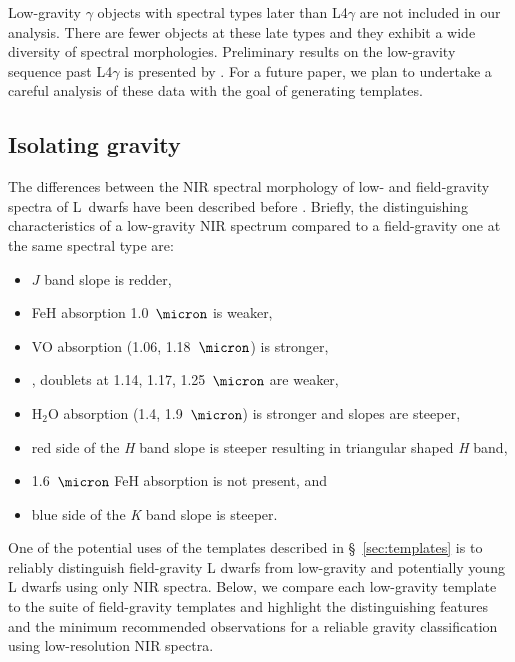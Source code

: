 \documentclass[12pt]{aastex6}
\begin{document}
Low-gravity $\gamma$ objects with spectral types later than L4$\gamma$ are not included in our analysis.
There are fewer objects at these late types and they exhibit a wide diversity of spectral morphologies.
Preliminary results on the low-gravity sequence past L4$\gamma$ is presented by \cite{Gagne:2015dc}.
For a future paper, we plan to undertake a careful analysis of these data with the goal of generating templates.

\subsection{Isolating gravity}

The differences between the NIR spectral morphology of low- and field-gravity spectra of L~dwarfs have been described before \citep{Lucas01,McGovern04,Kirkpatrick06,Allers:2013hk}. Briefly, the distinguishing characteristics of a low-gravity NIR spectrum compared to a field-gravity one at the same spectral type are:
\begin{itemize}
\item $J$ band slope is redder,
\item FeH absorption 1.0~$\micron$ is weaker,
\item VO absorption (1.06, 1.18~$\micron$) is stronger,
\item {},  doublets at 1.14, 1.17, 1.25~$\micron$ are weaker,
\item H$_2$O absorption (1.4, 1.9~$\micron$) is stronger and slopes are steeper,
\item red side of the \emph{H} band slope is steeper resulting in triangular shaped \emph{H} band,
\item 1.6~$\micron$ FeH absorption is not present, and
\item blue side of the \emph{K} band slope is steeper.
\end{itemize}

One of the potential uses of the templates described in \S~\ref{sec:templates} is to reliably distinguish field-gravity L dwarfs from low-gravity and potentially young L dwarfs using only NIR spectra.
Below, we compare each low-gravity template to the suite of field-gravity templates and highlight the distinguishing features and the minimum recommended observations for a reliable gravity classification using low-resolution NIR spectra.
\end{document}
